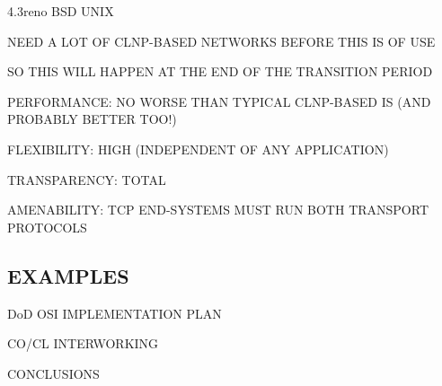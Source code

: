 \begin{bwslide}

\begin{nrtc}
\item	4.3reno BSD UNIX

\item	NEED A LOT OF CLNP-BASED NETWORKS BEFORE THIS IS OF USE

\item	SO THIS WILL HAPPEN AT THE END OF THE TRANSITION PERIOD
\end{nrtc}
\end{bwslide}


\begin{bwslide}

\begin{nrtc}
\item	PERFORMANCE: NO WORSE THAN TYPICAL CLNP-BASED IS
	(AND PROBABLY BETTER TOO!)

\item	FLEXIBILITY: HIGH (INDEPENDENT OF ANY APPLICATION)

\item	TRANSPARENCY: TOTAL

\item	AMENABILITY: TCP END-SYSTEMS MUST RUN BOTH TRANSPORT PROTOCOLS
\end{nrtc}
\end{bwslide}


\begin{bwslide}
\part	{EXAMPLES}\bf

\begin{nrtc}
\item	DoD OSI IMPLEMENTATION PLAN

\item	CO/CL INTERWORKING

\item	CONCLUSIONS
\end{nrtc}
\end{bwslide}


